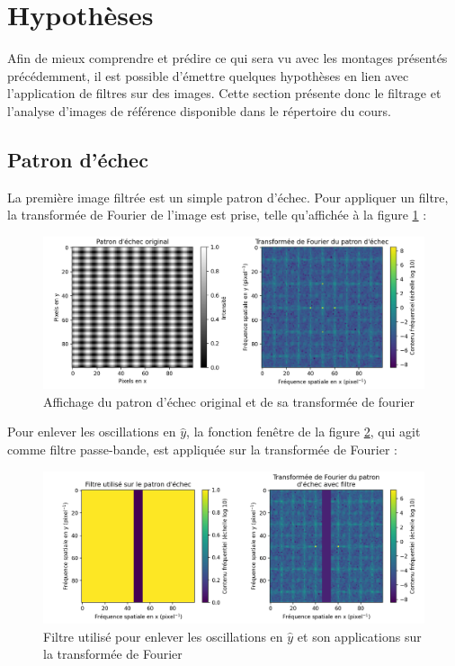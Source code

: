 \documentclass[11pt,letterpaper]{article}
\begin{document}
\section{Hypothèses}

Afin de mieux comprendre et prédire ce qui sera vu avec les montages présentés précédemment, il est possible d'émettre quelques hypothèses en lien avec l'application de filtres sur des images. Cette section présente donc le filtrage et l'analyse d'images de référence disponible dans le répertoire du cours.

\subsection{Patron d'échec}

La première image filtrée est un simple patron d'échec. Pour appliquer un filtre, la transformée de Fourier de l'image est prise, telle qu'affichée à la figure \ref{echec_patron} :

\begin{figure}[H]
  \centering
  \includegraphics[scale=0.68]{check.png}
  \caption{Affichage du patron d'échec original et de sa transformée de fourier}
  \label{echec_patron}
\end{figure}

Pour enlever les oscillations en $\hat{y}$, la fonction fenêtre de la figure \ref{echec_filtre}, qui agit comme filtre passe-bande, est appliquée sur la transformée de Fourier :

\begin{figure}[H]
  \centering
  \includegraphics[scale=0.68]{check_mask.png}
  \caption{Filtre utilisé pour enlever les oscillations en $\hat{y}$ et son applications sur la transformée de Fourier}
  \label{echec_filtre}
\end{figure}
\end{document}
